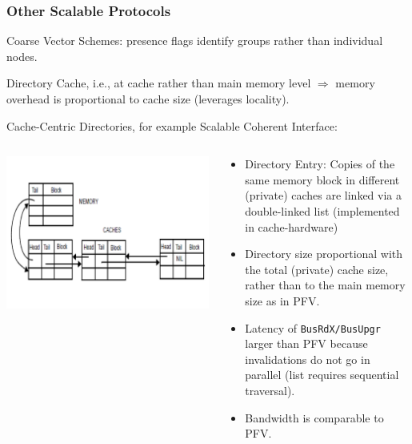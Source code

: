 \documentclass{beamer}
\renewcommand{\emph}[1]{\textcolor{structure}{#1}}
\newcommand{\emp}[1]{\textcolor{DikuRed}{ #1}}
\begin{document}
\begin{frame}[fragile,t]
\frametitle{Other Scalable Protocols}

\emp{Coarse Vector Schemes:} presence flags identify groups rather than individual nodes.
\smallskip

\emp{Directory Cache}, i.e., at cache rather than main memory level $\Rightarrow$
memory overhead is proportional to cache size (leverages locality).\medskip 

\emp{Cache-Centric Directories, for example Scalable Coherent Interface:}

\begin{columns}
\includegraphics[width=40ex]{Figures/FigsInfCoherence/CacheCentricProt}
\begin{scriptsize}
\begin{itemize}
    \item Directory Entry: Copies of the same memory block in different (private) 
            caches are linked via a double-linked list (implemented in cache-hardware)
    \item  \emph{Directory size proportional with the total (private) cache size},
            rather than to the main memory size as in PFV.
    \item \emp{Latency of {\tt BusRdX/BusUpgr} larger} than PFV because invalidations do not
            go in parallel (list requires sequential traversal).
    \item Bandwidth is comparable to PFV.
\end  {itemize}
\end{scriptsize}
\end{columns}

\end{frame}
\end{document}
